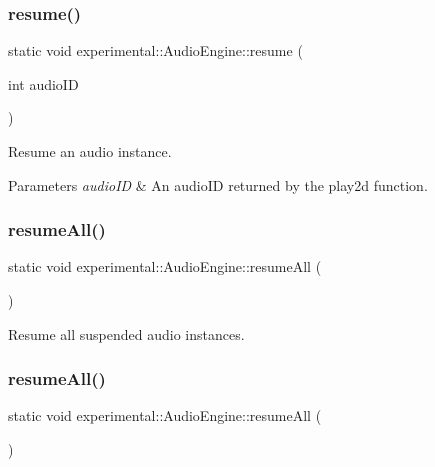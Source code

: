 \subsubsection{\texorpdfstring{resume()}{resume()}\hspace{0.1cm}{\footnotesize\ttfamily [2/2]}}
{\footnotesize\ttfamily static void experimental\+::\+Audio\+Engine\+::resume (\begin{DoxyParamCaption}\item[{int}]{audio\+ID }\end{DoxyParamCaption})\hspace{0.3cm}{\ttfamily [static]}}

Resume an audio instance.


\begin{DoxyParams}{Parameters}
{\em audio\+ID} & An audio\+ID returned by the play2d function. \\
\hline
\end{DoxyParams}
\mbox{\label{classexperimental_1_1AudioEngine_a8618e28e77cfeebe8cf6b2798ae90ae9}} 
\subsubsection{\texorpdfstring{resume\+All()}{resumeAll()}\hspace{0.1cm}{\footnotesize\ttfamily [1/2]}}
{\footnotesize\ttfamily static void experimental\+::\+Audio\+Engine\+::resume\+All (\begin{DoxyParamCaption}{ }\end{DoxyParamCaption})\hspace{0.3cm}{\ttfamily [static]}}

Resume all suspended audio instances. \mbox{\label{classexperimental_1_1AudioEngine_a8618e28e77cfeebe8cf6b2798ae90ae9}} 
\subsubsection{\texorpdfstring{resume\+All()}{resumeAll()}\hspace{0.1cm}{\footnotesize\ttfamily [2/2]}}
{\footnotesize\ttfamily static void experimental\+::\+Audio\+Engine\+::resume\+All (\begin{DoxyParamCaption}{ }\end{DoxyParamCaption})\hspace{0.3cm}{\ttfamily [static]}}

